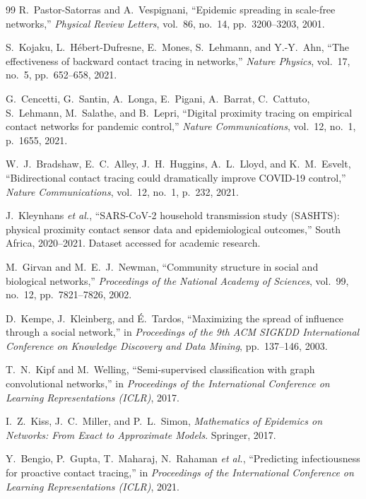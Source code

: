 \documentclass[12pt,a4paper]{report}
\theoremstyle{definition}
\begin{document}
\begin{thebibliography}{99}
    R.~Pastor-Satorras and A.~Vespignani,
    ``Epidemic spreading in scale-free networks,''
    \textit{Physical Review Letters}, vol.~86, no.~14, pp.~3200--3203, 2001.

    S.~Kojaku, L.~Hébert-Dufresne, E.~Mones, S.~Lehmann, and Y.-Y.~Ahn,
    ``The effectiveness of backward contact tracing in networks,''
    \textit{Nature Physics}, vol.~17, no.~5, pp.~652--658, 2021.

    G.~Cencetti, G.~Santin, A.~Longa, E.~Pigani, A.~Barrat, C.~Cattuto,
    S.~Lehmann, M.~Salathe, and B.~Lepri,
    ``Digital proximity tracing on empirical contact networks for pandemic control,''
    \textit{Nature Communications}, vol.~12, no.~1, p.~1655, 2021.

    W.~J.~Bradshaw, E.~C.~Alley, J.~H.~Huggins, A.~L.~Lloyd, and K.~M.~Esvelt,
    ``Bidirectional contact tracing could dramatically improve COVID-19 control,''
    \textit{Nature Communications}, vol.~12, no.~1, p.~232, 2021.

    J.~Kleynhans \textit{et al.},
    ``SARS-CoV-2 household transmission study (SASHTS): physical proximity contact sensor data and epidemiological outcomes,''
    South Africa, 2020--2021. Dataset accessed for academic research.

    M.~Girvan and M.~E.~J.~Newman,
    ``Community structure in social and biological networks,''
    \textit{Proceedings of the National Academy of Sciences},
    vol.~99, no.~12, pp.~7821--7826, 2002.

    D.~Kempe, J.~Kleinberg, and É.~Tardos,
    ``Maximizing the spread of influence through a social network,''
    in \textit{Proceedings of the 9th ACM SIGKDD International Conference on Knowledge Discovery and Data Mining},
    pp.~137--146, 2003.

    T.~N.~Kipf and M.~Welling,
    ``Semi-supervised classification with graph convolutional networks,''
    in \textit{Proceedings of the International Conference on Learning Representations (ICLR)}, 2017.

    I.~Z.~Kiss, J.~C.~Miller, and P.~L.~Simon,
    \textit{Mathematics of Epidemics on Networks: From Exact to Approximate Models}.
    Springer, 2017.

    Y.~Bengio, P.~Gupta, T.~Maharaj, N.~Rahaman \textit{et al.},
    ``Predicting infectiousness for proactive contact tracing,''
    in \textit{Proceedings of the International Conference on Learning Representations (ICLR)}, 2021.

\end{thebibliography}
\end{document}
